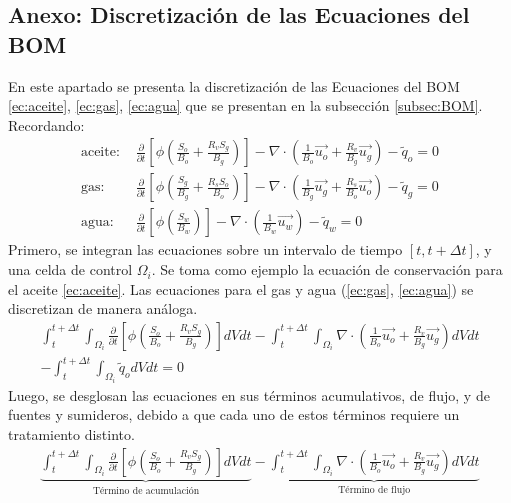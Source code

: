 \begin{appendix}
\chapter{Anexo: Discretización de las Ecuaciones del BOM}\label{AnexoA}
En este apartado se presenta la discretización de las Ecuaciones del BOM \ref{ec:aceite}, \ref{ec:gas}, \ref{ec:agua} que se presentan en la subsección \ref{subsec:BOM}. Recordando:
\begin{align*}
\text{aceite: }&\frac{\partial}{\partial t} \left[ \phi \left( \frac{S_{o}}{B_{o}} + \frac{R_{v} S_{g}}{B_{g}} \right) \right]
- \nabla \cdot \left( \frac{1}{B_{o}} \vec{u_{o}} + \frac{R_{v}}{B_{g}} \vec{u_{g}} \right) - \tilde{q}_{o}=0  \\
\text{gas: }&\frac{\partial}{\partial t} \left[ \phi \left( \frac{S_{g}}{B_{g}} + \frac{R_{s} S_{o}}{B_{o}} \right) \right]
- \nabla \cdot \left( \frac{1}{B_{g}} \vec{u_{g}} + \frac{R_{s}}{B_{o}} \vec{u_{o}} \right) - \tilde{q}_{g} = 0 \\
\text{agua: }&\frac{\partial}{\partial t} \left[\phi \left( \frac{S_{w}}{B_{w}} \right) \right] - \nabla \cdot \left( \frac{1}{B_{w}} \vec{u_{w}} \right) - \tilde{q}_{w} = 0 
\end{align*}
Primero, se integran las ecuaciones sobre un intervalo de tiempo $\left[t, t+\Delta t\right]$, y una celda de control $\Omega_{i}$. Se toma como ejemplo la ecuación de conservación para el aceite \ref{ec:aceite}. Las ecuaciones para el gas y agua (\ref{ec:gas}, \ref{ec:agua}) se discretizan de manera análoga.
\begin{align*}
	\int_{t}^{t+\Delta t}\int_{\Omega_{i}}\frac{\partial}{\partial t} \left[ \phi \left( \frac{S_{o}}{B_{o}} + \frac{R_{v} S_{g}}{B_{g}} \right) \right]dVdt
	- \int_{t}^{t+\Delta t}\int_{\Omega_{i}}\nabla \cdot \left( \frac{1}{B_{o}} \vec{u_{o}} + \frac{R_{v}}{B_{g}} \vec{u_{g}} \right)dVdt \\
	- \int_{t}^{t+\Delta t}\int_{\Omega_{i}}\tilde{q}_{o}dVdt=0 
\end{align*}
Luego, se desglosan las ecuaciones en sus términos acumulativos, de flujo, y de fuentes y sumideros, debido a que cada uno de estos términos requiere un tratamiento distinto.
\begin{align*}
\underbrace{\int_{t}^{t+\Delta t}\int_{\Omega_{i}}\frac{\partial}{\partial t} \left[ \phi \left( \frac{S_{o}}{B_{o}} + \frac{R_{v} S_{g}}{B_{g}} \right) \right]dVdt}_{\text{Término de acumulación}}
- \underbrace{\int_{t}^{t+\Delta t}\int_{\Omega_{i}}\nabla \cdot \left( \frac{1}{B_{o}} \vec{u_{o}} + \frac{R_{v}}{B_{g}} \vec{u_{g}} \right)dVdt}_\text{Término de flujo} \\

\end{align*}
\end{appendix}
